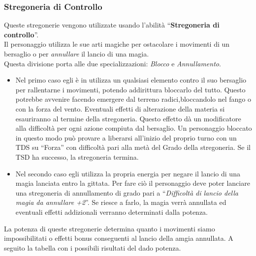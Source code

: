 \documentclass[../manuale_main.tex]{subfiles}
\begin{document}
\subsubsection{Stregoneria di Controllo}
Queste stregonerie vengono utilizzate usando l'abilità ``\textbf{Stregoneria di controllo}''.\\
Il personaggio utilizza le sue arti magiche per ostacolare i movimenti di un bersaglio o per \emph{annullare} il lancio di una magia. \\
Questa divisione porta alle due specializzazioni: \emph{Blocco} e \emph{Annullamento}.\\
\begin{itemize}
\item Nel primo caso egli è in utilizza un qualsiasi elemento contro il suo bersaglio per rallentarne i movimenti, potendo addirittura bloccarlo del tutto. Questo potrebbe avvenire facendo emergere dal terreno radici,bloccandolo nel fango o con la forza del vento. Eventuali effetti di alterazione della materia si esauriranno al termine della stregoneria. Questo effetto dà un modificatore alla difficoltà per ogni azione compiuta dal bersaglio. Un personaggio bloccato in questo modo può provare a liberarsi all'inizio del proprio turno con un TDS su ``Forza'' con difficoltà pari alla metà del Grado della stregoneria. Se il TSD ha successo, la stregoneria termina.
\item Nel secondo caso egli utilizza la propria energia per negare il lancio di una magia lanciata entro la gittata. Per fare ciò il personaggio deve poter lanciare una stregoneria di annullamento di grado pari a ``\emph{Difficoltà di lancio della magia da annullare +2}''. Se riesce a farlo, la magia verrà annullata ed eventuali effetti addizionali verranno determinati dalla potenza.
\end{itemize}
La potenza di queste stregonerie determina quanto i movimenti siamo impossibilitati o effetti bonus conseguenti al lancio della amgia annullata. A seguito la tabella con i possibili risultati del dado potenza.\\
\end{document}
